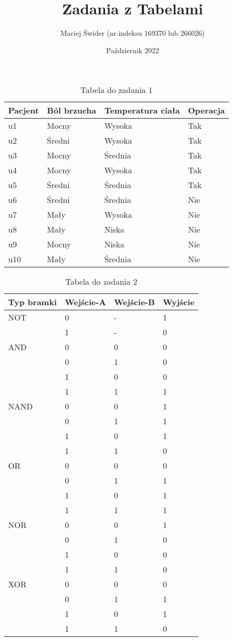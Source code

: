 \documentclass[12pt, letterpaper, titlepage]{article}
\title{Zadania z Tabelami}
\author{Maciej Świder (nr.indeksu 169370 lub 266026)}
\date{Październik 2022}
\begin{document}
\maketitle


\begin{table}[h] %
\centering\caption{Tabela do zadania 1}
\begin{tabular}{l|lll}
\hline
\hline
Pacjent & Ból brzucha & Temperatura ciała & Operacja\\
\hline
u1 & Mocny & Wysoka & Tak \\
\hline
u2 & Średni & Wysoka & Tak \\
\hline
u3 & Mocny & Średnia & Tak \\
\hline
u4 & Mocny & Wysoka & Tak \\
\hline
u5 & Średni & Średnia & Tak \\
\hline
u6 & Średni & Średnia & Nie \\
\hline
u7 & Mały & Wysoka & Nie \\
\hline
u8 & Mały & Niska & Nie \\
\hline
u9 & Mocny & Niska & Nie \\
\hline
u10 & Mały & Średnia & Nie \\
\hline
\hline

\end{tabular}
\end{table}

\begin{table}[h] %
\centering\caption{Tabela do zadania 2}
\begin{tabular}{l|l|l|l}
\hline
\hline
Typ bramki & Wejście-A & Wejście-B & Wyjście \\
\hline 
NOT & 0 & - & 1\\
\hline
 & 1 & - & 0\\
\hline
AND & 0 & 0 & 0\\
\hline
 & 0 & 1 & 0\\
\hline
 & 1 & 0 & 0\\
\hline
 & 1 & 1 & 1\\
\hline
NAND & 0 & 0 &1\\
\hline
 & 0 & 1 &1\\
\hline
 & 1 & 0 &1\\
\hline
 & 1 & 1 &0\\
\hline
OR & 0 & 0 &0\\
\hline
 & 0 & 1 &1\\
\hline
 & 1 & 0 &1\\
\hline
 & 1 & 1 &1\\
\hline
NOR & 0 & 0 &1\\
\hline
 & 0 & 1 &0\\
\hline
 & 1 & 0 &0\\
\hline
 & 1 & 1 &0\\
\hline
XOR & 0 & 0 &0\\
\hline
 & 0 & 1 &1\\
\hline
 & 1 & 0 &1\\
\hline
 & 1 & 1 &0\\
\hline
\hline


\end{tabular}
\end{table}
\end{document}
